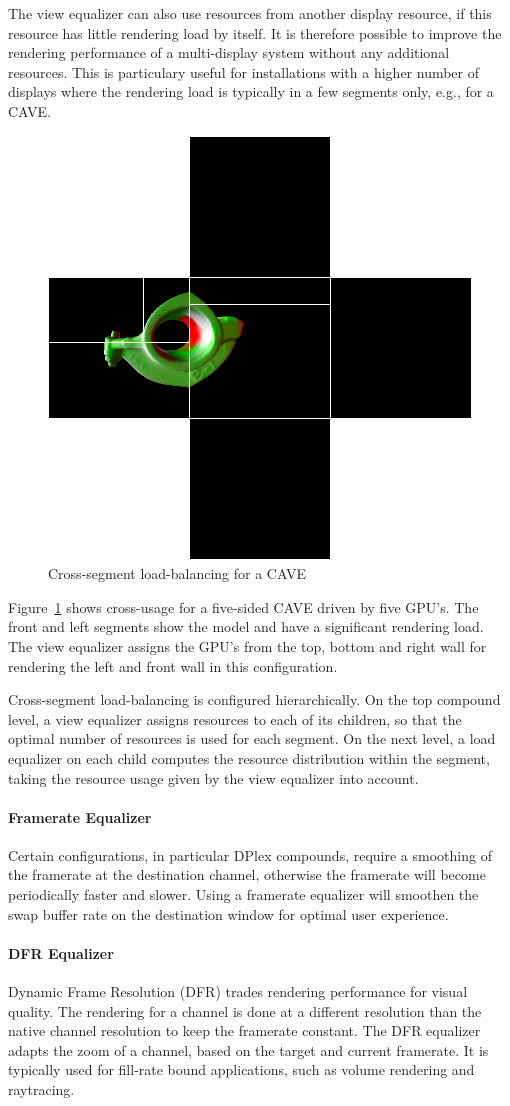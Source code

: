 \documentclass[10pt,a4]{scrartcl}
\newcommand{\fig}[1]{Figure~\ref{#1}}
\begin{document}
The view equalizer can also use resources from another display resource,
if this resource has little rendering load by itself. It is therefore
possible to improve the rendering performance of a multi-display system
without any additional resources. This is particulary useful for
installations with a higher number of displays where the rendering load
is typically in a few segments only, e.g., for a CAVE.

\begin{figure} 
    \includegraphics[width=.382\textwidth]{images/viewLB.png}
    {\caption{\label{fViewLoadBalancing2}\small Cross-segment
        load-balancing for a CAVE}}
\end{figure}
\fig{fViewLoadBalancing2} shows cross-usage for a five-sided CAVE driven
by five GPU's. The front and left segments show the model and have a
significant rendering load. The view equalizer assigns the GPU's from
the top, bottom and right wall for rendering the left and front wall in
this configuration.

Cross-segment load-balan\-cing is configured hierarchically. On the top
compound level, a view equalizer assigns resources to each of its
children, so that the optimal number of resources is used for each
segment. On the next level, a load equalizer on each child computes the
resource distribution within the segment, taking the resource usage
given by the view equalizer into account.

\paragraph{Framerate Equalizer}
Certain configurations, in particular DPlex compounds, require a
smoothing of the framerate at the destination channel, otherwise the
framerate will become periodically faster and slower. Using a framerate
equalizer will smoothen the swap buffer rate on the destination window
for optimal user experience.

\paragraph{DFR Equalizer}
Dynamic Frame Resolution (DFR) trades rendering performance for visual
quality. The rendering for a channel is done at a different resolution
than the native channel resolution to keep the framerate constant. The
DFR equalizer adapts the zoom of a channel, based on the target and
current framerate. It is typically used for fill-rate bound
applications, such as volume rendering and raytracing.
\end{document}
